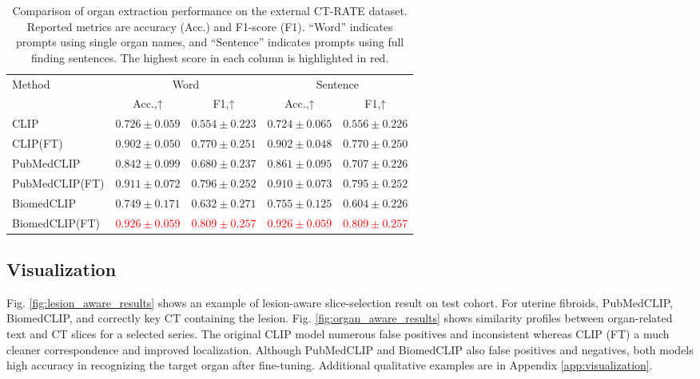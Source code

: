 \documentclass[bioengineering,article,submit,pdftex,moreauthors]{Definitions/mdpi}
\begin{document}
\begin{table}[ht]
  \centering
  \caption{ Comparison of organ extraction performance on the external CT-RATE dataset. 
  Reported metrics are accuracy (Acc.) and F1-score (F1). 
  “Word” indicates prompts using single organ names, and “Sentence” indicates prompts using full finding sentences. 
  The highest score in each column is highlighted in red.}
  \label{tab:organ_extraction_results_ctrate}
  \begin{tabular}{lcccc}
    \toprule
    \multirow{2}{*}{Method} & \multicolumn{2}{c}{Word}               & \multicolumn{2}{c}{Sentence}            \\
    \cmidrule(lr){2-3}\cmidrule(lr){4-5}
                          & Acc.,↑ & F1,↑         & Acc.,↑   & F1,↑           \\
    \midrule
    CLIP                    & $0.726\pm0.059$ & $0.554\pm0.223$ & $0.724\pm0.065$ & $0.556\pm0.226$  \\
    CLIP(FT)                & $0.902\pm0.050$ & $0.770\pm0.251$ & $0.902\pm0.048$ & $0.770\pm0.250$  \\
    PubMedCLIP              & $0.842\pm0.099$ & $0.680\pm0.237$ & $0.861\pm0.095$ & $0.707\pm0.226$  \\
    PubMedCLIP(FT)          & $0.911\pm0.072$ & $0.796\pm0.252$ & $0.910\pm0.073$ & $0.795\pm0.252$  \\
    BiomedCLIP              & $0.749\pm0.171$ & $0.632\pm0.271$ & $0.755\pm0.125$ & $0.604\pm0.226$  \\
    BiomedCLIP(FT)          & \textcolor{red}{$0.926\pm0.059$} & \textcolor{red}{$0.809\pm0.257$} & \textcolor{red}{$0.926\pm0.059$} & \textcolor{red}{$0.809\pm0.257$}  \\
    \bottomrule
  \end{tabular}
\end{table}


\subsection{Visualization}\label{sec:visualization}
Fig. \ref{fig:lesion_aware_results} shows an example of lesion-aware slice-selection result on  test cohort. 
For uterine fibroids, PubMedCLIP, BiomedCLIP, and  correctly  key CT  containing the lesion.
Fig. \ref{fig:organ_aware_results} shows similarity profiles between organ-related text and CT slices for a selected series. 
The original CLIP model  numerous false positives and inconsistent  whereas CLIP (FT)  a much cleaner correspondence and improved localization. 
Although PubMedCLIP and BiomedCLIP also  false positives and negatives, both models  high accuracy in recognizing the target organ after fine-tuning. 
Additional qualitative examples are  in Appendix \ref{app:visualization}.
\end{document}
